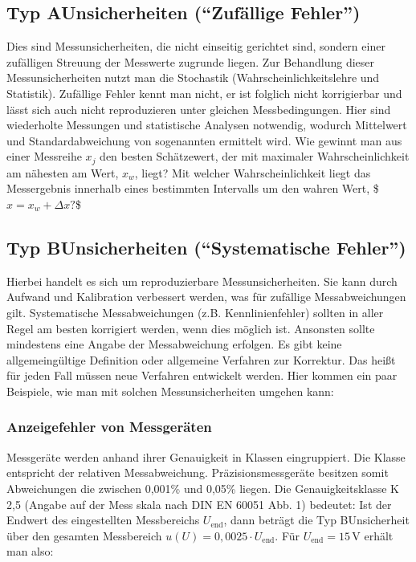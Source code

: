 \documentclass[letterpaper,10pt,english]{jupyterBook}
\begin{document}
\sphinxAtStartPar
{}


\subsection{Typ A\sphinxhyphen{}Unsicherheiten (“Zufällige Fehler”)}
\label{\detokenize{content/1_Messunsicherheiten:typ-a-unsicherheiten-zufallige-fehler}}
\sphinxAtStartPar
Dies sind Messunsicherheiten, die nicht einseitig gerichtet sind, sondern einer zufälligen Streuung der Messwerte zugrunde liegen. Zur Behandlung dieser Messunsicherheiten nutzt man die Stochastik (Wahrscheinlichkeitslehre und Statistik).
Zufällige Fehler kennt man nicht, er ist folglich nicht korrigierbar und lässt sich auch nicht reproduzieren unter gleichen Messbedingungen. Hier sind wiederholte Messungen und statistische Analysen notwendig, wodurch Mittelwert und Standardabweichung von sogenannten  ermittelt wird. Wie gewinnt man aus einer Messreihe \(x_j\) den besten Schätzewert, der mit maximaler Wahrscheinlichkeit am nähesten am  Wert, \(x_w\), liegt? Mit welcher Wahrscheinlichkeit liegt das Messergebnis innerhalb eines bestimmten Intervalls um den wahren Wert, \$\(x = x_w + \Delta x ?\)\$


\subsection{Typ B\sphinxhyphen{}Unsicherheiten (“Systematische Fehler”)}
\label{\detokenize{content/1_Messunsicherheiten:typ-b-unsicherheiten-systematische-fehler}}
\sphinxAtStartPar
Hierbei handelt es sich um reproduzierbare Messunsicherheiten.
Sie kann durch Aufwand und Kalibration verbessert werden, was  für zufällige Messabweichungen gilt. Systematische Messabweichungen (z.B. Kennlinienfehler) sollten in aller Regel am besten korrigiert werden, wenn dies möglich ist. Ansonsten sollte mindestens eine Angabe der Messabweichung erfolgen.
Es gibt keine allgemeingültige Definition oder allgemeine Verfahren zur Korrektur. Das heißt für jeden Fall müssen neue Verfahren entwickelt werden. Hier kommen ein paar Beispiele, wie man mit solchen  Messunsicherheiten umgehen kann:


\subsubsection{Anzeigefehler von Messgeräten}
\label{\detokenize{content/1_Messunsicherheiten:anzeigefehler-von-messgeraten}}
\sphinxAtStartPar
Messgeräte werden anhand ihrer Genauigkeit in Klassen eingruppiert. Die Klasse entspricht der relativen Messabweichung. Präzisionsmessgeräte besitzen somit Abweichungen die zwischen 0,001\% und 0,05\% liegen. Die Genauigkeitsklasse K 2,5 (Angabe auf der Mess\sphinxhyphen{} skala nach DIN EN 60051 Abb. 1) bedeutet: Ist der Endwert des eingestellten Messbereichs \(U_\mathrm{end}\), dann beträgt die Typ B\sphinxhyphen{}Unsicherheit über den gesamten Messbereich \(u(U) = 0,0025\cdot U_\mathrm{end}\). Für \(U_\mathrm{end} = 15\,\mathrm V\) erhält man also:
\end{document}
